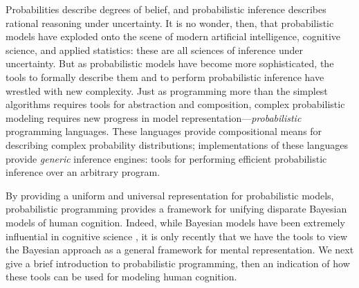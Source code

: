 \documentclass[12pt]{article}
\begin{document}
Probabilities describe degrees of belief, and probabilistic inference describes rational reasoning under uncertainty. It is no wonder, then, that probabilistic models have exploded onto the scene of modern artificial intelligence, cognitive science, and applied statistics: these are all sciences of inference under uncertainty. But as probabilistic models have become more sophisticated, the tools to formally describe them and to perform probabilistic inference have wrestled with new complexity. Just as programming more than the simplest algorithms requires tools for abstraction and composition, complex probabilistic modeling requires new progress in model representation---\emph{probabilistic} programming languages. These languages provide compositional means for describing complex probability distributions; implementations of these languages provide \emph{generic} inference engines: tools for performing efficient probabilistic inference over an arbitrary program. 

By providing a uniform and universal representation for probabilistic models, probabilistic programming provides a framework for unifying disparate Bayesian models of human cognition. Indeed, while Bayesian models have been extremely influential in cognitive science \cite[e.g.][]{tenenbaum2011}, 
it is only recently that we have the tools to view the Bayesian approach as a general framework for mental representation.
We next give a brief introduction to probabilistic programming, then an indication of how these tools can be used for modeling human cognition.
\end{document}
